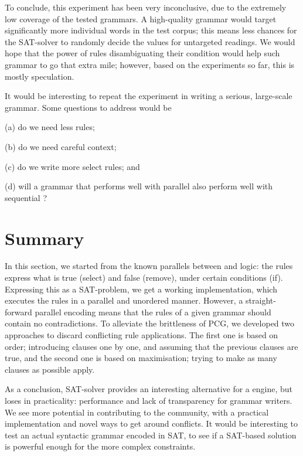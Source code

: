 To conclude, this experiment has been very inconclusive, due to the extremely low coverage
of the tested grammars.
A high-quality grammar would target significantly more individual words in the test corpus;
this means less chances for the SAT-solver to randomly decide the values for untargeted readings. We would hope that the power of rules disambiguating their condition would help
such grammar to go that extra mile; however, based on the experiments so far, this is mostly speculation.



It would be interesting to repeat the experiment in writing a serious, large-scale grammar.
Some questions to address would be
\begin{inparaenum}
\item[(a)] do we need less rules;
\item[(b)] do we need careful context;
\item[(c)] do we write more {\sc select} rules; and
\item[(d)] will a grammar that performs well with parallel \onlycg{} also perform well with sequential \onlycg{}?
\end{inparaenum}

\section{Summary}

In this section, we started from the known parallels between \onlycg{} and logic:
the rules express what is true ({\sc select}) and false ({\sc remove}), under certain conditions ({\sc if}).
Expressing this as a SAT-problem, we get a working \onlycg{} implementation, which executes the rules in a parallel and unordered manner.
However, a straight-forward parallel encoding means that the rules of a given grammar should contain no contradictions.
To alleviate the brittleness of PCG, we developed two approaches to discard conflicting rule applications.
The first one is based on order; introducing clauses one by one, and assuming that the previous clauses are true,
and the second one is based on maximisation; trying to make as many clauses as possible apply.


As a conclusion, SAT-solver provides an interesting alternative for a \onlycg{} engine, but loses in practicality: performance and lack of transparency for grammar writers.
We see more potential in contributing to the \fsig{} community, with a practical implementation and
novel ways to get around conflicts. It would be interesting to test an actual syntactic \fsig{} grammar encoded in SAT, to see if a SAT-based solution is powerful enough for the more complex constraints.
